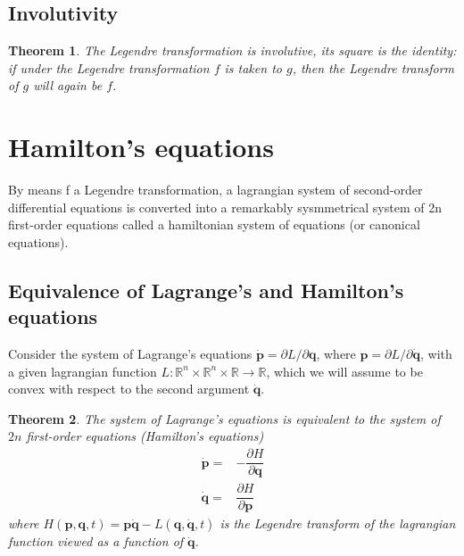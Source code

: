 \documentclass[conference]{IEEEtran}
\newtheorem{theorem}{Theorem}[section]
\theoremstyle{definition}
\theoremstyle{remark}
\begin{document}
    \subsection{Involutivity}
    \begin{theorem}
        The Legendre transformation is involutive, its square is the identity: if under the Legendre transformation $f$ is taken to $g$, then the Legendre transform of $g$ will again be $f$.
    \end{theorem}

    \section{Hamilton's equations}
    By means f a Legendre transformation, a lagrangian system of second-order differential equations is converted into a remarkably sysmmetrical system of 2n first-order equations called a hamiltonian system of equations (or canonical equations).

    \subsection{Equivalence of Lagrange's and Hamilton's equations}
    Consider the system of Lagrange's equations $\dot{\mathbf{p}} = \partial L / \partial \mathbf{q}$, where $\mathbf{p} = \partial L / \partial \dot{\mathbf{q}}$, with a given lagrangian function $L:\mathbb{R}^n \times \mathbb{R}^n \times \mathbb{R} \to \mathbb{R}$, which we will assume to be convex with respect to the second argument $\dot{\mathbf{q}}$.

    \begin{theorem}
        The system of Lagrange's equations is equivalent to the system of $2n$ first-order equations (Hamilton's equations)
        \begin{align*}
            \dot{\mathbf{p}} =& -\dfrac{\partial H}{\partial \mathbf{q}} \\
            \dot{\mathbf{q}} =& \dfrac{\partial H}{\partial \mathbf{p}}
        \end{align*}
        where $H(\mathbf{p}, \mathbf{q}, t) = \mathbf{p} \dot{\mathbf{q}} - L(\mathbf{q}, \dot{\mathbf{q}}, t)$ is the Legendre transform of the lagrangian function viewed as a function of $\dot{\mathbf{q}}$.
    \end{theorem}
\end{document}
